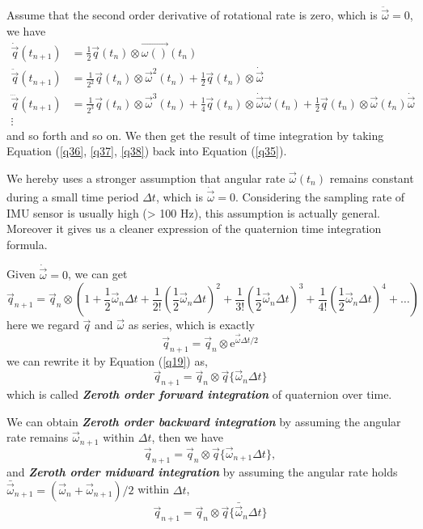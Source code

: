 Assume that the second order derivative of rotational rate is zero, which is $\ddot{\vec{\omega}} = 0$, we have
\begin{align} 
	\label{q36} 
	\dot{\vec{q}}(t_{n+1}) &= \frac{1}{2}\vec{q}(t_{n}) \otimes \vec{\omega()}(t_{n}) \\
	\label{q37} 
	\ddot{\vec{q}}(t_{n+1}) &= \frac{1}{2^2}\vec{q}(t_{n}) \otimes \vec{\omega}^2(t_{n})+\frac{1}{2}\vec{q}(t_{n}) \otimes \dot{\vec{\omega}} \\
	\label{q38} 
	\dddot{\vec{q}}(t_{n+1}) &= \frac{1}{2^3}\vec{q}(t_{n}) \otimes \vec{\omega}^3(t_{n}) + \frac{1}{4}\vec{q}(t_{n}) \otimes \dot{\vec{\omega}}\vec{\omega}(t_{n}) + \frac{1}{2}\vec{q}(t_{n}) \otimes \vec{\omega}(t_{n})\dot{\vec{\omega}} \\
	 \vdots & \nonumber 
\end{align}
and so forth and so on. We then get the result of time integration by taking Equation (\ref{q36}, \ref{q37}, \ref{q38}) back into Equation (\ref{q35}).

We hereby uses a stronger assumption that angular rate $\vec{\omega}(t_{n})$ remains constant during a small time period $\Delta{t}$, which is $\dot{\vec{\omega}} = 0$. Considering the sampling rate of IMU sensor is usually high (> 100 Hz), this assumption is actually general. Moreover it gives us a cleaner expression of the quaternion time integration formula. 

Given $\dot{\vec{\omega}} = 0$, we can get
\begin{equation} \label{q39} 
	\vec{q}_{n+1} = \vec{q}_n \otimes (1+\frac{1}{2}\vec{\omega}_n\Delta{t}+\frac{1}{2!}(\frac{1}{2}\vec{\omega}_n\Delta{t})^2+\frac{1}{3!}(\frac{1}{2}\vec{\omega}_n\Delta{t})^3+\frac{1}{4!}(\frac{1}{2}\vec{\omega}_n\Delta{t})^4+\dots)
\end{equation}
here we regard $\vec{q}$ and $\vec{\omega}$ as series, which is exactly
\begin{equation} \label{q40} 
	\vec{q}_{n+1} = \vec{q}_n \otimes \mathrm{e}^{\vec{\omega}\Delta{t}/2}
\end{equation}
we can rewrite it by Equation (\ref{q19}) as,
\begin{equation} \label{q41} 
	\vec{q}_{n+1} = \vec{q}_n \otimes \vec{q}\{ \vec{\omega}_n\Delta{t} \}
\end{equation}
which is called \textbf{\textit{Zeroth order forward integration}} of quaternion over time.

We can obtain \textbf{\textit{Zeroth order backward integration}} by assuming the angular rate remains $\vec{\omega}_{n+1}$ within $\Delta{t}$, then we have
\begin{equation} \label{q42} 
	\vec{q}_{n+1} = \vec{q}_n \otimes \vec{q}\{ \vec{\omega}_{n+1}\Delta{t} \},
\end{equation}
and \textbf{\textit{Zeroth order midward integration}}  by assuming the angular rate holds $\bar{\vec{\omega}}_{n+1} =(\vec{\omega}_{n}+ \vec{\omega}_{n+1})/2$ within $\Delta{t}$,
\begin{equation} \label{q43} 
	\vec{q}_{n+1} = \vec{q}_n \otimes \vec{q}\{ \bar{\vec{\omega}}_{n}\Delta{t} \}
\end{equation}

